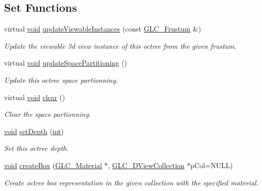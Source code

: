 \subsection*{Set Functions}
\begin{DoxyCompactItemize}
\item 
virtual \hyperlink{group___u_a_v_objects_plugin_ga444cf2ff3f0ecbe028adce838d373f5c}{void} \hyperlink{class_g_l_c___octree_ac789b028df6982b7749e04a4ea117faa}{update\-Viewable\-Instances} (const \hyperlink{class_g_l_c___frustum}{G\-L\-C\-\_\-\-Frustum} \&)
\begin{DoxyCompactList}\small\item\em Update the viewable 3d view instance of this octree from the given frustum. \end{DoxyCompactList}\item 
virtual \hyperlink{group___u_a_v_objects_plugin_ga444cf2ff3f0ecbe028adce838d373f5c}{void} \hyperlink{class_g_l_c___octree_a73a2ab558f0eaa06c49bd2ce99457d04}{update\-Space\-Partitioning} ()
\begin{DoxyCompactList}\small\item\em Update this octree space partionning. \end{DoxyCompactList}\item 
virtual \hyperlink{group___u_a_v_objects_plugin_ga444cf2ff3f0ecbe028adce838d373f5c}{void} \hyperlink{class_g_l_c___octree_acc03a7dfb3a1bdde25d0cc31e655663b}{clear} ()
\begin{DoxyCompactList}\small\item\em Clear the space partionning. \end{DoxyCompactList}\item 
\hyperlink{group___u_a_v_objects_plugin_ga444cf2ff3f0ecbe028adce838d373f5c}{void} \hyperlink{class_g_l_c___octree_ad68185b1689a4132a4b72b821760db57}{set\-Depth} (\hyperlink{ioapi_8h_a787fa3cf048117ba7123753c1e74fcd6}{int})
\begin{DoxyCompactList}\small\item\em Set this octree depth. \end{DoxyCompactList}\item 
\hyperlink{group___u_a_v_objects_plugin_ga444cf2ff3f0ecbe028adce838d373f5c}{void} \hyperlink{class_g_l_c___octree_a1fad69a2351c61838cac2ca84213bd5e}{create\-Box} (\hyperlink{class_g_l_c___material}{G\-L\-C\-\_\-\-Material} $\ast$, \hyperlink{class_g_l_c__3_d_view_collection}{G\-L\-C\-\_\-D\-View\-Collection} $\ast$p\-Col=N\-U\-L\-L)
\begin{DoxyCompactList}\small\item\em Create octree box representation in the given collection with the specified material. \end{DoxyCompactList}\item 

\end{DoxyCompactItemize}
